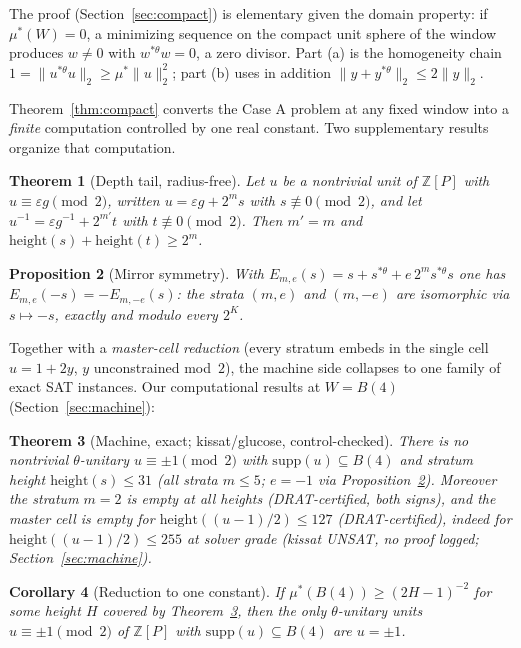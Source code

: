 \documentclass[11pt]{article}
\newtheorem{theorem}{Theorem}[section]
\newtheorem{proposition}[theorem]{Proposition}
\newtheorem{corollary}[theorem]{Corollary}
\newcommand{\ZZ}{\mathbb{Z}}
\newcommand{\thst}{{*\theta}}
\newcommand{\hgt}{\mathrm{height}}
\newcommand{\supp}{\mathrm{supp}}
\begin{document}
The proof (Section~\ref{sec:compact}) is elementary given the domain
property: if $\mu^*(W)=0$, a minimizing sequence on the compact unit
sphere of the window produces $w\ne 0$ with $w^{\thst}w=0$, a zero
divisor.  Part (a) is the homogeneity chain
$1=\|u^{\thst}u\|_2\ge\mu^*\|u\|_2^2$; part (b) uses in addition
$\|y+y^{\thst}\|_2\le 2\|y\|_2$.

Theorem~\ref{thm:compact} converts the Case A problem at any fixed
window into a \emph{finite} computation controlled by one real
constant.  Two supplementary results organize that computation.

\begin{theorem}[Depth tail, radius-free]\label{thm:tail}
Let $u$ be a nontrivial unit of $\ZZ[P]$ with $u\equiv \varepsilon g
\pmod 2$, written $u=\varepsilon g+2^m s$ with $s\not\equiv 0 \pmod
2$, and let $u^{-1}=\varepsilon g^{-1}+2^{m'}t$ with
$t\not\equiv 0\pmod 2$.  Then $m'=m$ and $\hgt(s)+\hgt(t)\ge 2^m$.
\end{theorem}

\begin{proposition}[Mirror symmetry]\label{prop:mirror}
With $E_{m,e}(s)=s+s^{\thst}+e\,2^m s^{\thst}s$ one has
$E_{m,e}(-s)=-E_{m,-e}(s)$: the strata $(m,e)$ and $(m,-e)$ are
isomorphic via $s\mapsto -s$, exactly and modulo every $2^K$.
\end{proposition}

Together with a \emph{master-cell reduction} (every stratum embeds in
the single cell $u=1+2y$, $y$ unconstrained mod~$2$), the machine side
collapses to one family of exact SAT instances.  Our computational
results at $W=B(4)$ (Section~\ref{sec:machine}):

\begin{theorem}[Machine, exact; kissat/glucose, control-checked]
\label{thm:ladder}
There is no nontrivial $\theta$-unitary $u\equiv\pm1\pmod 2$ with
$\supp(u)\subseteq B(4)$ and stratum height $\hgt(s)\le 31$
(all strata $m\le 5$; $e=-1$ via Proposition~\ref{prop:mirror}).
Moreover the stratum $m=2$ is empty at \emph{all} heights
(DRAT-certified, both signs), and the master cell is empty for
$\hgt((u-1)/2)\le 127$ (DRAT-certified), indeed for
$\hgt((u-1)/2)\le 255$ at solver grade (kissat UNSAT, no proof
logged; Section~\ref{sec:machine}).
\end{theorem}

\begin{corollary}[Reduction to one constant]\label{cor:onecst}
If $\mu^*(B(4))\ge (2H-1)^{-2}$ for some height $H$ covered by
Theorem~\ref{thm:ladder}, then the only $\theta$-unitary units
$u\equiv\pm1\pmod 2$ of $\ZZ[P]$ with $\supp(u)\subseteq B(4)$ are
$u=\pm1$.
\end{corollary}
\end{document}
